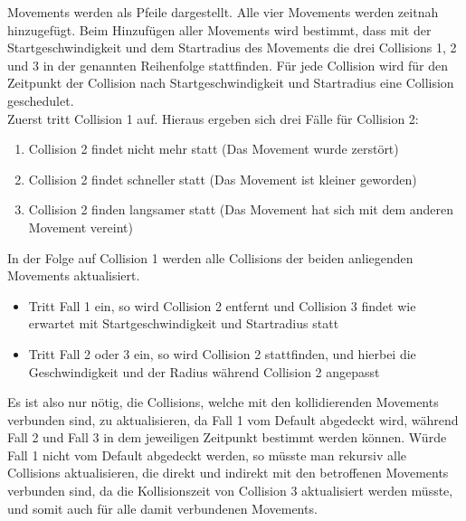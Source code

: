 Movements werden als Pfeile dargestellt. Alle vier Movements werden zeitnah hinzugefügt. Beim Hinzufügen aller Movements wird bestimmt, dass mit der Startgeschwindigkeit und dem Startradius des Movements die drei Collisions 1, 2 und 3 in der genannten Reihenfolge stattfinden. Für jede Collision wird für den Zeitpunkt der Collision nach Startgeschwindigkeit und Startradius eine Collision geschedulet. \\
Zuerst tritt Collision 1 auf. Hieraus ergeben sich drei Fälle für Collision 2:
\begin{enumerate}
	\item Collision 2 findet nicht mehr statt (Das Movement wurde zerstört)
	\item Collision 2 findet schneller statt (Das Movement ist kleiner geworden)
	\item Collision 2 finden langsamer statt (Das Movement hat sich mit dem anderen Movement vereint)
\end{enumerate}
In der Folge auf Collision 1 werden alle Collisions der beiden anliegenden Movements aktualisiert. \\
\begin{itemize}
	\item Tritt Fall 1 ein, so wird Collision 2 entfernt und Collision 3 findet wie erwartet mit Startgeschwindigkeit und Startradius statt
	\item Tritt Fall 2 oder 3 ein, so wird Collision 2 stattfinden, und hierbei die Geschwindigkeit und der Radius während Collision 2 angepasst
\end{itemize}
Es ist also nur nötig, die Collisions, welche mit den kollidierenden Movements verbunden sind, zu aktualisieren, da Fall 1 vom Default abgedeckt wird, während Fall 2 und Fall 3 in dem jeweiligen Zeitpunkt bestimmt werden können. Würde Fall 1 nicht vom Default abgedeckt werden, so müsste man rekursiv alle Collisions aktualisieren, die direkt und indirekt mit den betroffenen Movements verbunden sind, da die Kollisionszeit von Collision 3 aktualisiert werden müsste, und somit auch für alle damit verbundenen Movements. \\

